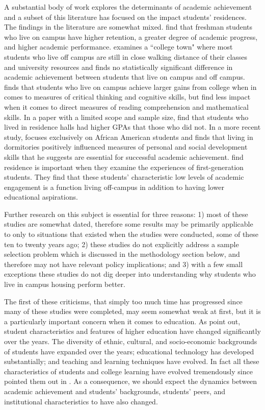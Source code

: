\documentclass[12pt]{article}
\newcommand{\citee}[1]{\citename{#1} \citeyear{#1}}
\begin{document}
A substantial body of work explores the determinants of academic achievement and a subset of this literature has focused on the impact students' residences. The findings in the literature are somewhat mixed. \citee{tsr1993} find that freshman students who live on campus have higher retention, a greater degree of academic progress, and higher academic performance. \citee{delucchi1993} examines a ``college town" where most students who live off campus are still in close walking distance of their classes and university resources and finds no statistically significant difference in academic achievement between students that live on campus and off campus. \citee{pascarella1993} finds that students who live on campus achieve larger gains from college when in comes to measures of critical thinking and cognitive skills, but find less impact when it comes to direct measures of reading comprehension and mathematical skills. In a paper with a limited scope and sample size, \citee{kanoy1996} find that students who lived in residence halls had higher GPAs that those who did not. In a more recent study, \citee{flowers2004} focuses exclusively on African American students and finds that living in dormitories positively influenced measures of personal and social development skills that he suggests are essential for successful academic achievement. \citee{pikekuh2005} find residence is important when they examine the experiences of first-generation students. They find that these students' characteristic low levels of academic engagement is a function living off-campus in addition to having lower educational aspirations.

Further research on this subject is essential for three reasons: 1) most of these studies are somewhat dated, therefore some results may be primarily applicable to only to situations that existed when the studies were conducted, some of these ten to twenty years ago; 2) these studies do not explicitly address a sample selection problem which is discussed in the methodology section below, and therefore may not have relevant policy implications; and 3) with a few small exceptions these studies do not dig deeper into understanding why students who live in campus housing perform better.

The first of these criticisms, that simply too much time has progressed since many of these studies were completed, may seem somewhat weak at first, but it is a particularly important concern when it comes to education. As \citee{pt1991} point out, student characteristics and features of higher education have changed significantly over the years. The diversity of ethnic, cultural, and socio-economic backgrounds of students have expanded over the years; educational technology has developed substantially; and teaching and learning techniques have evolved. In fact all these characteristics of students and college learning have evolved tremendously since  pointed them out in \citeyear{pt1991}. As a consequence, we should expect the dynamics between academic achievement and students' backgrounds, students' peers, and institutional characteristics to have also changed.
\end{document}
